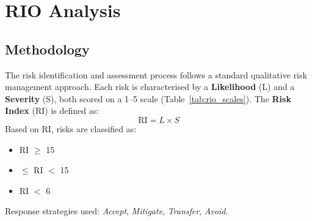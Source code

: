 %
%

\section{RIO Analysis}
\label{sec:rio}

\subsection{Methodology}
\label{subsec:rio_method}

The risk identification and assessment process follows a standard qualitative
risk management approach. Each risk is characterised by a \textbf{Likelihood}
(L) and a \textbf{Severity} (S), both scored on a 1--5 scale (Table~\ref{tab:rio_scales}).
The \textbf{Risk Index} (RI) is defined as:
\[
    \mathrm{RI} = L \times S
\]
Based on RI, risks are classified as:
\begin{itemize}[nosep]
    \item \riskhigh{} \quad RI $\geq$ 15
    \item \riskmedium{}  $\leq$ RI $<$ 15
    \item \risklow{} \quad RI $<$ 6
\end{itemize}

Response strategies used: \textit{Accept}, \textit{Mitigate},
\textit{Transfer}, \textit{Avoid}.

